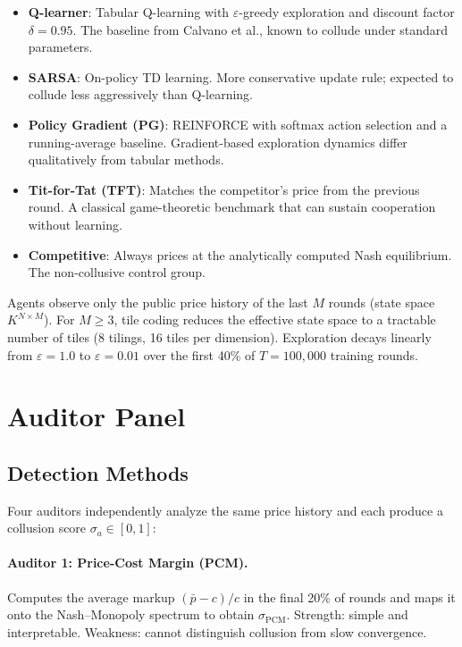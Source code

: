 \documentclass[11pt]{article}
\begin{document}
\begin{itemize}
  \item \textbf{Q-learner}: Tabular Q-learning with $\varepsilon$-greedy exploration and discount factor $\delta = 0.95$. The baseline from Calvano et al., known to collude under standard parameters.
  \item \textbf{SARSA}: On-policy TD learning. More conservative update rule; expected to collude less aggressively than Q-learning.
  \item \textbf{Policy Gradient (PG)}: REINFORCE with softmax action selection and a running-average baseline. Gradient-based exploration dynamics differ qualitatively from tabular methods.
  \item \textbf{Tit-for-Tat (TFT)}: Matches the competitor's price from the previous round. A classical game-theoretic benchmark that can sustain cooperation without learning.
  \item \textbf{Competitive}: Always prices at the analytically computed Nash equilibrium. The non-collusive control group.
\end{itemize}

Agents observe only the public price history of the last $M$ rounds (state space $K^{N \times M}$).
For $M \geq 3$, tile coding reduces the effective state space to a tractable number of tiles (8 tilings, 16 tiles per dimension).
Exploration decays linearly from $\varepsilon = 1.0$ to $\varepsilon = 0.01$ over the first 40\% of $T = 100{,}000$ training rounds.

\section{Auditor Panel}

\subsection{Detection Methods}

Four auditors independently analyze the same price history and each produce a collusion score $\sigma_a \in [0, 1]$:

\paragraph{Auditor 1: Price-Cost Margin (PCM).}
Computes the average markup $(\bar{p} - c)/c$ in the final 20\% of rounds and maps it onto the Nash--Monopoly spectrum to obtain $\sigma_\text{PCM}$.
Strength: simple and interpretable.
Weakness: cannot distinguish collusion from slow convergence.
\end{document}
